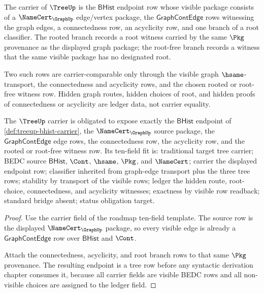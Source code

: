 \begin{definition}\label{def:treeup-bhist-carrier}
The carrier of $\TreeUp$ is the $\mathsf{BHist}$ endpoint row whose visible
package consists of a $\NameCert_{\GraphUp}$ edge/vertex package, the
$\mathsf{GraphContEdge}$ rows witnessing the graph edges, a connectedness row,
an acyclicity row, and one branch of a root classifier. The rooted branch
records a root witness carried by the same $\Pkg$ provenance as the displayed
graph package; the root-free branch records a witness that the same visible
package has no designated root.

Two such rows are carrier-comparable only through the visible graph
$\hsame$-transport, the connectedness and acyclicity rows, and the chosen
rooted or root-free witness row. Hidden graph routes, hidden choices of root,
and hidden proofs of connectedness or acyclicity are ledger data, not carrier
equality.
\end{definition}

\begin{theorem}\label{thm:treeup-carrier-obligation}
The $\TreeUp$ carrier is obligated to expose exactly the $\mathsf{BHist}$
endpoint of \autoref{def:treeup-bhist-carrier}, the
$\NameCert_{\GraphUp}$ source package, the $\mathsf{GraphContEdge}$ edge rows,
the connectedness row, the acyclicity row, and the rooted or root-free witness
row. Its ten-field fit is: traditional target tree carrier; BEDC source
$\mathsf{BHist}$, $\Cont$, $\hsame$, $\Pkg$, and $\NameCert$; carrier the
displayed endpoint row; classifier inherited from graph-edge transport plus
the three tree rows; stability by transport of the visible rows; ledger the
hidden route, root-choice, connectedness, and acyclicity witnesses; exactness
by visible row readback; standard bridge absent; status obligation target.
\end{theorem}
\begin{proof}
Use the carrier field of the roadmap ten-field template. The source row is the
displayed $\NameCert_{\GraphUp}$ package, so every visible edge is already a
$\mathsf{GraphContEdge}$ row over $\mathsf{BHist}$ and $\Cont$.

Attach the connectedness, acyclicity, and root branch rows to that same
$\Pkg$ provenance. The resulting endpoint is a tree row before any syntactic
derivation chapter consumes it, because all carrier fields are visible BEDC
rows and all non-visible choices are assigned to the ledger field.
\end{proof}

